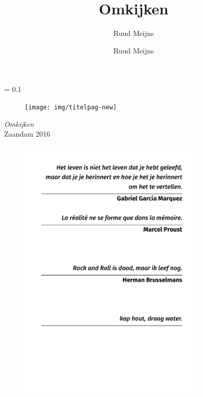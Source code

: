\documentclass[12pt,twoside, openright]{memoir}
\author{Ruud Meijns}
\author{Ruud Meijns}
\title{Omkijken}
\date{}
\newlength{\drop}%
\newcommand*{\titleS}{\begingroup%
\drop = 0.1\textheight
\centering
\vspace*{\drop}

\begin{figure}
\texttt{[image: img/titelpag-new]}
\end{figure}

\endgroup}
\begin{document}
\pagestyle{plain}
\let\cleardoublepage\clearpage
\thispagestyle{empty}
\titleS




\frontmatter

\null\vfill
\thispagestyle{empty}
\begin{flushleft}
\textit{Omkijken}\\
\vfil
Zaandam 
2016
\end{flushleft}
\clearpage

\let\cleardoublepage\clearpage
\clearpage

\thispagestyle{empty}
\begin{flushright}
\begin{figure}
\includegraphics[width=0.8\textwidth, right]{img/epi/epi1}
\end{figure}
\end{flushright}

\clearpage
\thispagestyle{empty}
~
\clearpage

\setcounter{tocdepth}{0}
\tableofcontents


\clearpage
\thispagestyle{empty}
~
\clearpage


\mainmatter
\sloppy
\end{document}
